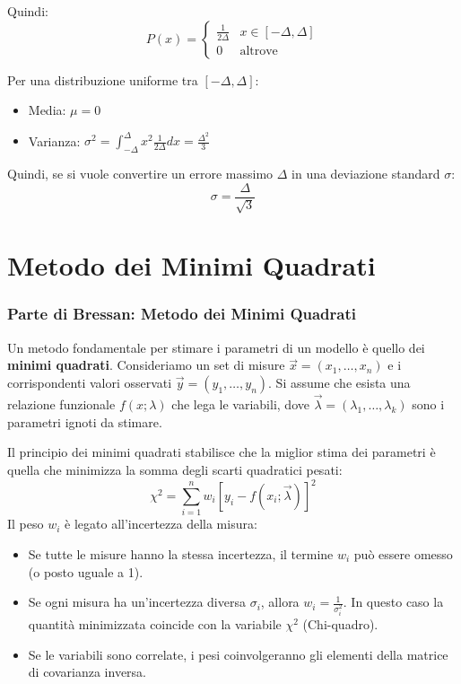 \documentclass{article}
\theoremstyle{remark}
\newcommand{\ripasso}[1]{
    \subsubsection{\texorpdfstring{\color{red}Parte di Bressan: #1}{Parte di Bressan: #1}}
}
\begin{document}
Quindi:
\[ P(x) = \begin{cases} \frac{1}{2\Delta} & x \in [-\Delta, \Delta] \\ 0 & \text{altrove} \end{cases} \]

Per una distribuzione uniforme tra $[-\Delta, \Delta]$:
\begin{itemize}
    \item Media: $\mu = 0$
    \item Varianza: $\sigma^2 = \int_{-\Delta}^{\Delta} x^2 \frac{1}{2\Delta} dx = \frac{\Delta^2}{3}$
\end{itemize}
Quindi, se si vuole convertire un errore massimo $\Delta$ in una deviazione standard $\sigma$:
\begin{equation}
    \sigma = \frac{\Delta}{\sqrt{3}}
\end{equation}

\section{Metodo dei Minimi Quadrati}

\ripasso{Metodo dei Minimi Quadrati}

Un metodo fondamentale per stimare i parametri di un modello è quello dei \textbf{minimi quadrati}. 
Consideriamo un set di misure $\vec{x}=(x_1, \dots, x_n)$ e i corrispondenti valori osservati $\vec{y}=(y_1, \dots, y_n)$. Si assume che esista una relazione funzionale $f(x; \lambda)$ che lega le variabili, dove $\vec{\lambda} = (\lambda_1, \dots, \lambda_k)$ sono i parametri ignoti da stimare.

Il principio dei minimi quadrati stabilisce che la miglior stima dei parametri è quella che minimizza la somma degli scarti quadratici pesati:
\[
\chi^2 = \sum_{i=1}^{n} w_i \left[ y_i - f(x_i; \vec{\lambda}) \right]^2
\]
Il peso $w_i$ è legato all'incertezza della misura:
\begin{itemize}
    \item Se tutte le misure hanno la stessa incertezza, il termine $w_i$ può essere omesso (o posto uguale a 1).
    \item Se ogni misura ha un'incertezza diversa $\sigma_i$, allora $w_i = \frac{1}{\sigma_i^2}$. In questo caso la quantità minimizzata coincide con la variabile $\chi^2$ (Chi-quadro).
    \item Se le variabili sono correlate, i pesi coinvolgeranno gli elementi della matrice di covarianza inversa.
\end{itemize}
\end{document}
